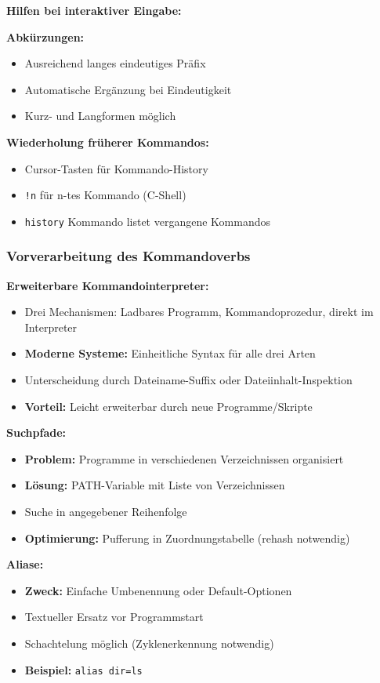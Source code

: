 \documentclass[9pt,a4paper]{extarticle}
\begin{document}
\begin{multicols*}{2}
\textbf{Hilfen bei interaktiver Eingabe:}

\textbf{Abkürzungen:}
\begin{itemize}
\item Ausreichend langes eindeutiges Präfix
\item Automatische Ergänzung bei Eindeutigkeit
\item Kurz- und Langformen möglich
\end{itemize}

\textbf{Wiederholung früherer Kommandos:}
\begin{itemize}
\item Cursor-Tasten für Kommando-History
\item \texttt{!n} für n-tes Kommando (C-Shell)
\item \texttt{history} Kommando listet vergangene Kommandos
\end{itemize}

\subsubsection{Vorverarbeitung des Kommandoverbs}
\textbf{Erweiterbare Kommandointerpreter:}
\begin{itemize}
\item Drei Mechanismen: Ladbares Programm, Kommandoprozedur, direkt im Interpreter
\item \textbf{Moderne Systeme:} Einheitliche Syntax für alle drei Arten
\item Unterscheidung durch Dateiname-Suffix oder Dateiinhalt-Inspektion
\item \textbf{Vorteil:} Leicht erweiterbar durch neue Programme/Skripte
\end{itemize}

\textbf{Suchpfade:}
\begin{itemize}
\item \textbf{Problem:} Programme in verschiedenen Verzeichnissen organisiert
\item \textbf{Lösung:} PATH-Variable mit Liste von Verzeichnissen
\item Suche in angegebener Reihenfolge
\item \textbf{Optimierung:} Pufferung in Zuordnungstabelle (rehash notwendig)
\end{itemize}

\textbf{Aliase:}
\begin{itemize}
\item \textbf{Zweck:} Einfache Umbenennung oder Default-Optionen
\item Textueller Ersatz vor Programmstart
\item Schachtelung möglich (Zyklenerkennung notwendig)
\item \textbf{Beispiel:} \texttt{alias dir=ls}
\end{itemize}


\end{multicols*}
\end{document}
